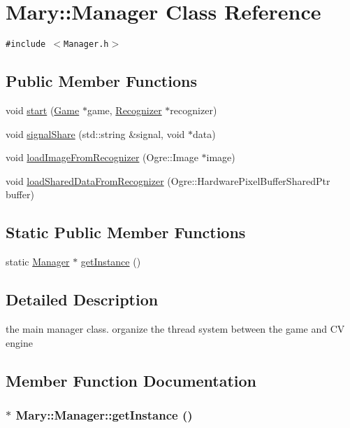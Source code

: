 \hypertarget{class_mary_1_1_manager}{
\section{Mary::Manager Class Reference}
\label{class_mary_1_1_manager}
}
{\tt \#include $<$Manager.h$>$}

\subsection*{Public Member Functions}
\begin{CompactItemize}
\item 
void \hyperlink{class_mary_1_1_manager_6b46c90621b16345ff560417d165ebcd}{start} (\hyperlink{class_mary_1_1_game}{Game} $\ast$game, \hyperlink{class_mary_1_1_recognizer}{Recognizer} $\ast$recognizer)
\item 
void \hyperlink{class_mary_1_1_manager_3f86e2f7f44b0f1ff78f92e6e6987dd8}{signalShare} (std::string \&signal, void $\ast$data)
\item 
void \hyperlink{class_mary_1_1_manager_a0092d09a8fbcd8969242ad257ba1cb6}{loadImageFromRecognizer} (Ogre::Image $\ast$image)
\item 
void \hyperlink{class_mary_1_1_manager_d1c3a719937335e1357dd600b10d815d}{loadSharedDataFromRecognizer} (Ogre::HardwarePixelBufferSharedPtr buffer)
\end{CompactItemize}
\subsection*{Static Public Member Functions}
\begin{CompactItemize}
\item 
static \hyperlink{class_mary_1_1_manager}{Manager} $\ast$ \hyperlink{class_mary_1_1_manager_c6a6695327e7025c5db451a3c9c4ce59}{getInstance} ()
\end{CompactItemize}


\subsection{Detailed Description}
the main manager class. organize the thread system between the game and CV engine 

\subsection{Member Function Documentation}
\hypertarget{class_mary_1_1_manager_c6a6695327e7025c5db451a3c9c4ce59}{
\subsubsection[getInstance]{ $\ast$ Mary::Manager::getInstance ()}}
\label{class_mary_1_1_manager_c6a6695327e7025c5db451a3c9c4ce59}


